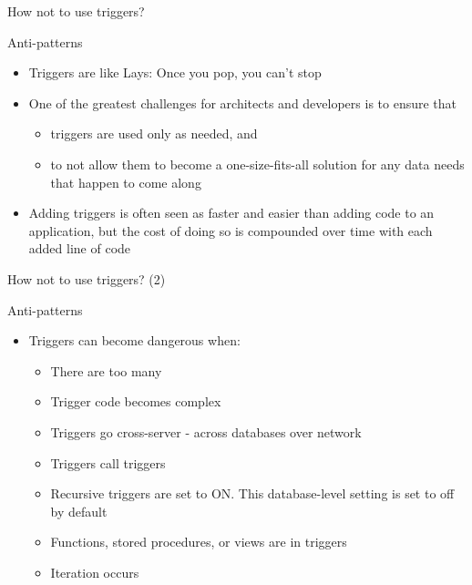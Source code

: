\documentclass[aspectratio=169, xcolor=dvipsnames]{beamer}
\begin{document}
\begin{frame}{How not to use triggers?}
    \begin{block}{Anti-patterns}
        \begin{itemize}[<+->]
            \item Triggers are like Lays: Once you pop, you can't stop
            \item One of the greatest challenges for architects and developers is to ensure that
            \begin{itemize}
                \item[$\triangleright$] triggers are used only as needed, and
                \item[$\triangleright$] to not allow them to become a one-size-fits-all solution for any data needs that happen to come along
            \end{itemize}
            \item Adding triggers is often seen as faster and easier than adding code to an application, but the cost of doing so is compounded over time with each added line of code
        \end{itemize}
    \end{block}
    \vspace{1em}
\end{frame}

\begin{frame}{How not to use triggers? (2)}
    \begin{block}{Anti-patterns}
        \begin{itemize}[<+->]
            \item Triggers can become dangerous when:
            \begin{itemize}
                \item[$\triangleright$] There are too many
                \item[$\triangleright$] Trigger code becomes complex
                \item[$\triangleright$] Triggers go cross-server - across databases over network
                \item[$\triangleright$] Triggers call triggers
                \item[$\triangleright$] Recursive triggers are set to ON. This database-level setting is set to off by default
                \item[$\triangleright$] Functions, stored procedures, or views are in triggers
                \item[$\triangleright$] Iteration occurs
            \end{itemize}
        \end{itemize}
    \end{block}
    \vspace{1em}
\end{frame}
\end{document}
